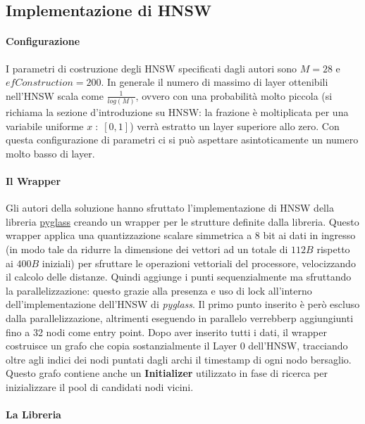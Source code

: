 \subsection{Implementazione di HNSW}

\paragraph{Configurazione}

I parametri di costruzione degli HNSW specificati dagli autori sono $M = 28$ e $efConstruction = 200$.
In generale il numero di massimo di layer ottenibili nell'HNSW scala come $\frac 1 {log(M)}$, ovvero con una probabilit\`a molto piccola (si richiama la sezione d'introduzione su HNSW: la frazione \`e moltiplicata per una variabile uniforme $x \; : \; [0,1]$) verr\`a estratto un layer superiore allo zero. Con questa configurazione di parametri ci si pu\`o aspettare asintoticamente un numero molto basso di layer.

\paragraph{Il Wrapper}

Gli autori della soluzione hanno sfruttato l'implementazione di HNSW della libreria \href{https://github.com/zilliztech/pyglass/tree/master}{pyglass} creando un wrapper per le strutture definite dalla libreria.
Questo wrapper applica una quantizzazione scalare simmetrica a $8$ bit ai dati in ingresso (in modo tale da ridurre la dimensione 
dei vettori ad un totale di $112 B$ rispetto ai $400 B$ iniziali) per sfruttare le operazioni vettoriali del processore, velocizzando il calcolo delle distanze.
Quindi aggiunge i punti sequenzialmente ma sfruttando la parallelizzazione: questo grazie alla presenza e uso di lock all'interno dell'implementazione dell'HNSW di \textit{pyglass}.
Il primo punto inserito \`e per\`o escluso dalla parallelizzazione, altrimenti eseguendo in parallelo verrebberp aggiungiunti fino a 32 nodi come entry point.
Dopo aver inserito tutti i dati, il wrapper costruisce un grafo che copia sostanzialmente il Layer 0 dell'HNSW, tracciando oltre agli indici dei nodi puntati dagli archi il timestamp di ogni nodo bersaglio.
Questo grafo contiene anche un \textbf{Initializer} utilizzato in fase di ricerca per inizializzare il pool di candidati nodi vicini.

\paragraph{La Libreria}

